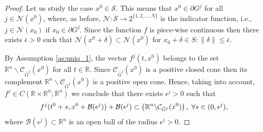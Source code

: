 \documentclass{article}
\newcommand{\R}{\mathbb{R}}
\begin{document}
\begin{proof}
	Let us study the case $x^0\in \mathcal{S}$. 	This means that $x^0\in \partial G^j$ for all $j\in \mathcal{N}(x^0)$, where, as before, $\mathcal{N}:\mathcal{S}\to 2^{\{1,2,...,N\}}$ is the indicator function, i.e., $j\in \mathcal{N}(x_0)$ if $x_0\in \partial G^{j}$.
	Since the function $f$ is piece-wise continuous then  there exists $\bar \epsilon>0$ 
	such that $\mathcal{N}(x^0+\delta)\subset \mathcal{N}(x^0)$ for $x_0+\delta\in S: \|\delta\|\leq \bar \epsilon$. 
	
	
	
	By 
	Assumption \ref{as:uniq_1}, the vector $f^j(t,x^0)$ belongs to the set $\R^n\backslash \mathcal{C}_{\bar  G^{j}}(x^0)$ 
	for all $t\in \R$.
	Since $\mathcal{C}_{\bar G^{j}}(x^0)$ is a positive closed cone then its complement $\R^n\backslash \mathcal{C}_{\bar G^{j}}(x^0)$ is a positive open cone.
	Hence, taking into account,
	$f^j\in C(\R\times \R^n;\R^n)$  we conclude that there exists $\epsilon^j>0$ such that \vspace{-1mm}
	$$
    f^j(t^0+s,x^0+\mathcal{B}(\epsilon^j))+\mathcal{B}(\epsilon^j) \subset  \left(\R^n\backslash {\mathcal{C}}_{\bar G^{j}}(x^0)\right), 	\; \forall s\in (0,\epsilon^j),\vspace{-1mm}
	$$
 where $\mathcal{B}(\epsilon^j)\subset \R^n$ is an open  ball of the radius $\epsilon^j>0$.
	

\end{proof}
\end{document}
